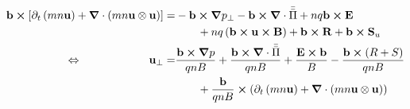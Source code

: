 \begin{align}
	\mathbf{b}\cross\left[\partial_t \left(mn\mathbf{u}\right) + \grad\cdot\left(mn\mathbf{u}\otimes\mathbf{u}\right)\right] =& -\mathbf{b}\cross\grad p_\perp - \mathbf{b}\cross\grad\cdot\bar{\bar{\Pi}} + nq\mathbf{b}\cross\mathbf{E} \nonumber\\ & \qquad + nq\left(\mathbf{b}\cross\mathbf{u}\cross\mathbf{B}\right) + \mathbf{b}\cross\mathbf{R} + \mathbf{b}\cross\mathbf{S}_u \nonumber \\
	\Leftrightarrow\qquad \qquad \qquad
	\mathbf{u}_\perp =& \frac{\mathbf{b}\cross\grad p}{qnB} + \frac{\mathbf{b}\cross\grad\cdot\bar{\bar{\Pi}}}{qnB} +  \frac{\mathbf{E}\cross\mathbf{b}}{B} - \frac{\mathbf{b}\cross\left(R+S\right)}{qnB} \nonumber\\ & \qquad + \frac{\mathbf{b}}{qnB} \cross \left(\partial_t \left(mn\mathbf{u}\right) + \grad\cdot\left(mn\mathbf{u}\otimes\mathbf{u}\right)\right)
\end{align}

